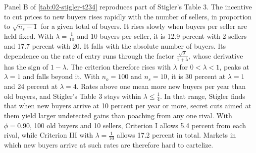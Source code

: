 Panel B of \cref{tab:02-stigler-t234} reproduces part of Stigler's Table 3. The incentive to cut prices to new
buyers rises rapidly with the number of sellers, in proportion to $\sqrt{n_s - 1}$ for a given total of buyers. It
rises slowly when buyers per seller are held fixed. With $\lambda = \frac{1}{10}$ and 10 buyers per seller, it is
12.9 percent with 2 sellers and 17.7 percent with 20. It falls with the absolute number of buyers. Its dependence
on the rate of entry runs through the factor $\frac{\sqrt{\lambda}}{1 + \lambda}$, whose derivative has the sign of
$1 - \lambda$. The criterion therefore rises with $\lambda$ for $0 < \lambda < 1$, peaks at $\lambda = 1$ and falls
beyond it. With $n_o = 100$ and $n_s = 10$, it is 30 percent at $\lambda = 1$ and 24 percent at $\lambda = 4$. Rates
above one mean more new buyers per year than old buyers, and Stigler's Table 3 stays within $\lambda \le
\frac{1}{4}$. In that range, Stigler finds that when new buyers arrive at 10 percent per year or more, secret cuts
aimed at them yield larger undetected gains than poaching from any one rival. With $\phi = 0.90$, 100 old
buyers and 10 sellers, Criterion I allows 5.4 percent from each rival, while Criterion III with $\lambda =
\frac{1}{10}$ allows 17.2 percent in total. Markets in which new buyers arrive at such rates are therefore hard to
cartelize.

